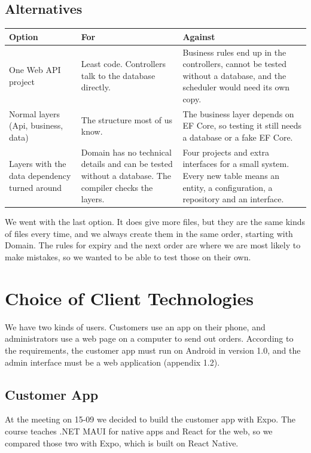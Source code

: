 \documentclass[a4paper,11pt]{article}
\begin{document}
\subsection{Alternatives}
\begin{center}
\begin{tabular}{@{}p{3.1cm} p{5.6cm} p{5.6cm}@{}}
\textbf{Option} & \textbf{For} & \textbf{Against} \\
\hline
One Web API project & Least code. Controllers talk to the database directly. & Business rules end up in the controllers, cannot be tested without a database, and the scheduler would need its own copy. \\
\hline
Normal layers (Api, business, data) & The structure most of us know. & The business layer depends on EF Core, so testing it still needs a database or a fake EF Core. \\
\hline
Layers with the data dependency turned around & Domain has no technical details and can be tested without a database. The compiler checks the layers. & Four projects and extra interfaces for a small system. Every new table means an entity, a configuration, a repository and an interface. \\
\hline
\end{tabular}
\end{center}
We went with the last option. It does give more files, but they are the same kinds of files every time, and we always create them in the same order, starting with Domain. The rules for expiry and the next order are where we are most likely to make mistakes, so we wanted to be able to test those on their own.

\section{Choice of Client Technologies}
\label{sec:clients}
We have two kinds of users. Customers use an app on their phone, and administrators use a web page on a computer to send out orders. According to the requirements, the customer app must run on Android in version 1.0, and the admin interface must be a web application (appendix 1.2).

\subsection{Customer App}
At the meeting on 15-09 we decided to build the customer app with Expo. The course teaches .NET MAUI for native apps and React for the web, so we compared those two with Expo, which is built on React Native.
\end{document}
